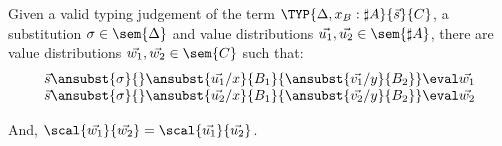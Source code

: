 \begin{lemma}\label{lem:InnerProdSingleVar} %
Given a valid typing judgement of the term $\TYP{\Delta,x_B:\sharp A}{\vec{s}}{C}$, a substitution $\sigma\in\sem{\Delta}$ and value distributions $\vec{u_1},\vec{u_2}\in\sem{\sharp A}$, there are value distributions $\vec{w_1}, \vec{w_2}\in\sem{C}$ such that:
\[
\begin{array}{c}
    \vec{s}\ansubst{\sigma}{}\ansubst{\vec{u_1}/x}{B_1}{\ansubst{\vec{v_1}/y}{B_2}}\eval\vec{w_1}\\
    \vec{s}\ansubst{\sigma}{}\ansubst{\vec{u_2}/x}{B_1}{\ansubst{\vec{v_2}/y}{B_2}}\eval\vec{w_2}\\
\end{array}
\]

And, $\scal{\vec{w_1}}{\vec{w_2}} = \scal{\vec{u_1}}{\vec{u_2}}$.
\end{lemma}

